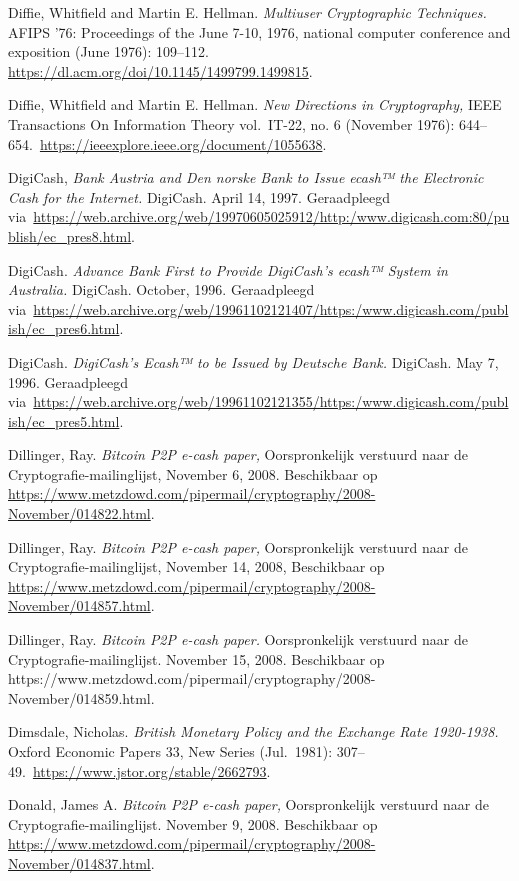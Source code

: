 \documentclass[
  a5paper,
  smalldemyvopaper,11pt,twoside,onecolumn,openright,extrafontsizes,
hidelinks]{memoir}
\begin{document}
{Diffie, Whitfield and Martin E. Hellman. \emph{Multiuser Cryptographic
Techniques.} AFIPS '76: Proceedings of the June 7-10, 1976, national
computer conference and exposition (June 1976): 109--112.
\url{https://dl.acm.org/doi/10.1145/1499799.1499815}.

Diffie, Whitfield and Martin E. Hellman. \emph{New Directions in
Cryptography,} IEEE Transactions On Information Theory vol.~IT-22, no. 6
(November 1976):
644--654.~\url{https://ieeexplore.ieee.org/document/1055638}.

DigiCash, \emph{Bank Austria and Den norske Bank to Issue ecash™ the
Electronic Cash for the Internet.} DigiCash. April 14, 1997.
Geraadpleegd
via~\url{https://web.archive.org/web/19970605025912/http:/www.digicash.com:80/publish/ec_pres8.html}.

DigiCash. \emph{Advance Bank First to Provide DigiCash's ecash™ System
in Australia.} DigiCash. October, 1996. Geraadpleegd
via~\url{https://web.archive.org/web/19961102121407/https:/www.digicash.com/publish/ec_pres6.html}.

DigiCash. \emph{DigiCash's Ecash™ to be Issued by Deutsche Bank.}
DigiCash. May 7, 1996. Geraadpleegd
via~\url{https://web.archive.org/web/19961102121355/https:/www.digicash.com/publish/ec_pres5.html}.

Dillinger, Ray. \emph{Bitcoin P2P e-cash paper,} Oorspronkelijk
verstuurd naar de Cryptografie-mailinglijst, November 6, 2008.
Beschikbaar op
\url{https://www.metzdowd.com/pipermail/cryptography/2008-November/014822.html}.

Dillinger, Ray. \emph{Bitcoin P2P e-cash paper,} Oorspronkelijk
verstuurd naar de Cryptografie-mailinglijst, November 14, 2008,
Beschikbaar op
\url{https://www.metzdowd.com/pipermail/cryptography/2008-November/014857.html}.

Dillinger, Ray. \emph{Bitcoin P2P e-cash paper.} Oorspronkelijk
verstuurd naar de Cryptografie-mailinglijst. November 15, 2008.
Beschikbaar op
https://www.metzdowd.com/pipermail/cryptography/2008-November/014859.html.

Dimsdale, Nicholas. \emph{British Monetary Policy and the Exchange Rate
1920-1938.} Oxford Economic Papers 33, New Series (Jul.~1981):
307--49.~\url{https://www.jstor.org/stable/2662793}.

Donald, James A. \emph{Bitcoin P2P e-cash paper,} Oorspronkelijk
verstuurd naar de Cryptografie-mailinglijst. November 9, 2008.
Beschikbaar op
\url{https://www.metzdowd.com/pipermail/cryptography/2008-November/014837.html}.

}
\end{document}
